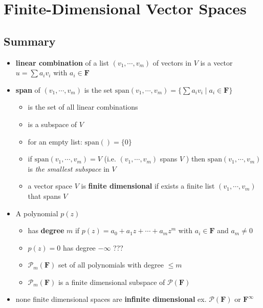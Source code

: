 %



\section{Finite-Dimensional Vector Spaces}
\subsection*{Summary}
\begin{itemize}
\item \textbf{linear combination} of a list $(v_1, \cdots, v_m)$ of vectors in $V$ is a vector $u = \sum a_i v_i$ with $a_i\in \mathbf{F}$
\item \textbf{span} of $(v_1, \cdots, v_m)$ is the set $\mathrm{span}(v_1, \cdots, v_m) = \{ \sum a_i v_i \mid a_i\in\mathbf{F}\}$
\begin{itemize}
  \item is the set of all linear combinations
  \item is a subspace of $V$
  \item for an empty list: $\mathrm{span}() = \{0\}$
  \item if $\mathrm{span}(v_1, \cdots, v_m) = V$ (i.e. $(v_1, \cdots, v_m)$ spans $V$ ) then $\mathrm{span}(v_1, \cdots, v_m)$ is \emph{the smallest subspace} in $V$
  \item a vector space $V$ is \textbf{finite dimensional} if exists a finite list $(v_1, \cdots, v_m)$ that spans $V$
\end{itemize}
\item A polynomial $p(z)$ 
\begin{itemize}
  \item has \textbf{degree} $m$ if $p(z)=a_0+a_1z+\cdots+a_mz^m$ with $a_i\in \mathbf{F}$ and $a_m\neq 0$
  \item $p(z)=0$ has degree $-\infty$ ???
  \item $\mathcal{P}_m(\mathbf{F})$ set of all polynomials with degree $\leq m$
  \item $\mathcal{P}_m(\mathbf{F})$ is a finite dimensional subspace of $\mathcal{P}(\mathbf{F})$
\end{itemize}
\item none finite dimensional spaces are \textbf{infinite dimensional} ex. $\mathcal{P}(\mathbf{F})$ or $\mathbf{F}^\infty$

\end{itemize}

